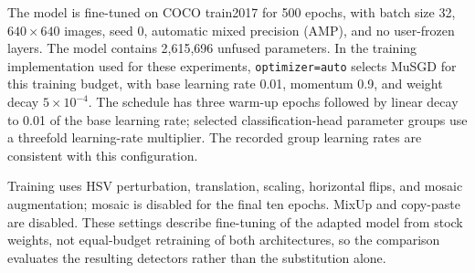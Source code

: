 The model is fine-tuned on COCO train2017 for 500 epochs, with batch size 32,
$640\times640$ images, seed 0, automatic mixed precision (AMP), and no
user-frozen layers. The model contains 2,615,696 unfused parameters. In the
training implementation used for these experiments,
\texttt{optimizer=auto} selects MuSGD for this training budget, with base
learning rate 0.01, momentum 0.9, and weight decay $5\times10^{-4}$.
The schedule has three warm-up epochs followed by linear decay to 0.01 of
the base learning rate; selected classification-head parameter groups use
a threefold learning-rate multiplier. The recorded group learning rates
are consistent with this configuration.

Training uses HSV perturbation, translation, scaling, horizontal flips, and
mosaic augmentation; mosaic is disabled for the final ten epochs. MixUp and
copy-paste are disabled. These settings describe fine-tuning of the adapted
model from stock weights, not equal-budget retraining of both architectures, so
the comparison evaluates the resulting detectors rather than the substitution
alone.
